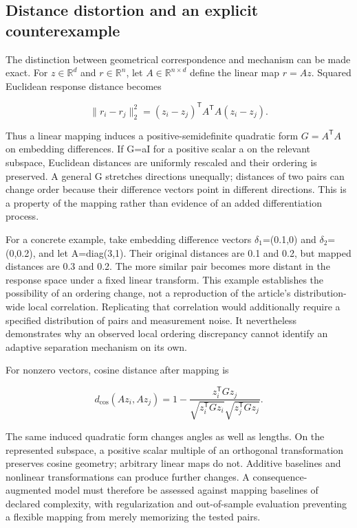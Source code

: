\documentclass[11pt]{article}
\begin{document}
\hypertarget{distance-distortion-and-an-explicit-counterexample}{%
\subsection{Distance distortion and an explicit
counterexample}\label{distance-distortion-and-an-explicit-counterexample}}

The distinction between geometrical correspondence and mechanism can be
made exact. For \(z\in\mathbb R^d\) and \(r\in\mathbb R^n\), let
\(A\in\mathbb R^{n\times d}\) define the linear map \(r=Az\). Squared
Euclidean response distance becomes

\begin{equation}
\|r_i-r_j\|_2^2=(z_i-z_j)^{\mathsf T}A^{\mathsf T}A(z_i-z_j).
\end{equation}

Thus a linear mapping induces a positive-semidefinite quadratic form
\(G=A^{\mathsf T}A\) on embedding differences. If G=aI for a positive
scalar a on the relevant subspace, Euclidean distances are uniformly
rescaled and their ordering is preserved. A general G stretches
directions unequally; distances of two pairs can change order because
their difference vectors point in different directions. This is a
property of the mapping rather than evidence of an added differentiation
process.

For a concrete example, take embedding difference vectors
\(\delta_1\)=(0.1,0) and \(\delta_2\)=(0,0.2), and let A=diag(3,1).
Their original distances are 0.1 and 0.2, but mapped distances are 0.3
and 0.2. The more similar pair becomes more distant in the response
space under a fixed linear transform. This example establishes the
possibility of an ordering change, not a reproduction of the article's
distribution-wide local correlation. Replicating that correlation would
additionally require a specified distribution of pairs and measurement
noise. It nevertheless demonstrates why an observed local ordering
discrepancy cannot identify an adaptive separation mechanism on its own.

For nonzero vectors, cosine distance after mapping is

\begin{equation}
d_{\cos}(Az_i,Az_j)=1-
\frac{z_i^{\mathsf T}Gz_j}
{\sqrt{z_i^{\mathsf T}Gz_i}\sqrt{z_j^{\mathsf T}Gz_j}}.
\end{equation}

The same induced quadratic form changes angles as well as lengths. On
the represented subspace, a positive scalar multiple of an orthogonal
transformation preserves cosine geometry; arbitrary linear maps do not.
Additive baselines and nonlinear transformations can produce further
changes. A consequence-augmented model must therefore be assessed
against mapping baselines of declared complexity, with regularization
and out-of-sample evaluation preventing a flexible mapping from merely
memorizing the tested pairs.
\end{document}
